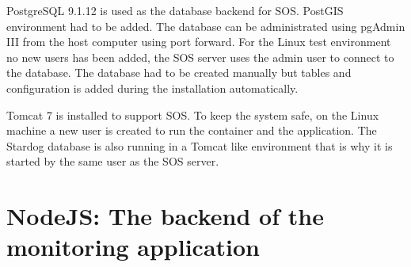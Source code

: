 PostgreSQL 9.1.12 is used as the database backend for SOS. PostGIS environment had to be added. The database can be administrated using pgAdmin III from the host computer using port forward. For the Linux test environment no new users has been added, the SOS server uses the admin user to connect to the database. The database had to be created manually but tables and configuration is added during the installation automatically.

Tomcat 7 is installed to support SOS. To keep the system safe, on the Linux machine a new user is created to run the container and the application. The Stardog database is also running in a Tomcat like environment that is why it is started by the same user as the SOS server. 

\section{NodeJS: The backend of the monitoring application}

